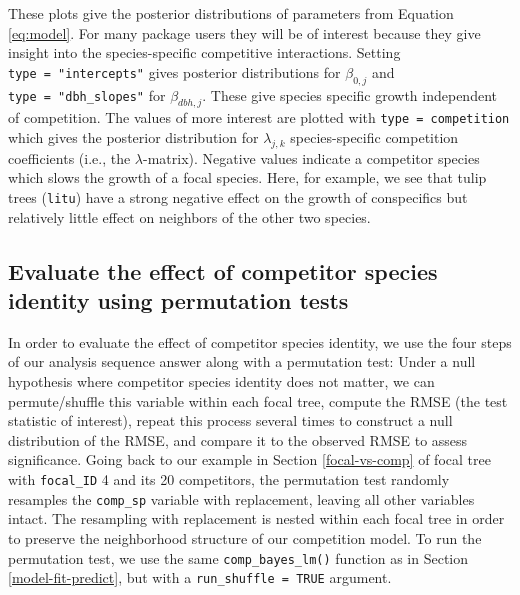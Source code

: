 \documentclass[12pt]{article}
\begin{document}
These plots give the posterior distributions of parameters from Equation
\ref{eq:model}. For many package users they will be of interest because
they give insight into the species-specific competitive interactions.
Setting \texttt{type\ =\ "intercepts"} gives posterior distributions for
\(\beta_{0,j}\) and \texttt{type\ =\ "dbh\_slopes"} for
\(\beta_{dbh,j}\). These give species specific growth independent of
competition. The values of more interest are plotted with
\texttt{type\ =\ \textquotesingle{}competition\textquotesingle{}} which
gives the posterior distribution for \(\lambda_{j,k}\) species-specific
competition coefficients (i.e., the \(\lambda\)-matrix). Negative values
indicate a competitor species which slows the growth of a focal species.
Here, for example, we see that tulip trees (\texttt{litu}) have a strong
negative effect on the growth of conspecifics but relatively little
effect on neighbors of the other two species.

\hypertarget{evaluate-the-effect-of-competitor-species-identity-using-permutation-tests}{%
\subsection{Evaluate the effect of competitor species identity using
permutation
tests}\label{evaluate-the-effect-of-competitor-species-identity-using-permutation-tests}}

In order to evaluate the effect of competitor species identity, we use
the four steps of our analysis sequence answer along with a permutation
test: Under a null hypothesis where competitor species identity does not
matter, we can permute/shuffle this variable within each focal tree,
compute the RMSE (the test statistic of interest), repeat this process
several times to construct a null distribution of the RMSE, and compare
it to the observed RMSE to assess significance. Going back to our
example in Section \ref{focal-vs-comp} of focal tree with
\texttt{focal\_ID} 4 and its 20 competitors, the permutation test
randomly resamples the \texttt{comp\_sp} variable with replacement,
leaving all other variables intact. The resampling with replacement is
nested within each focal tree in order to preserve the neighborhood
structure of our competition model. To run the permutation test, we use
the same \texttt{comp\_bayes\_lm()} function as in Section
\ref{model-fit-predict}, but with a \texttt{run\_shuffle\ =\ TRUE}
argument.
\end{document}

